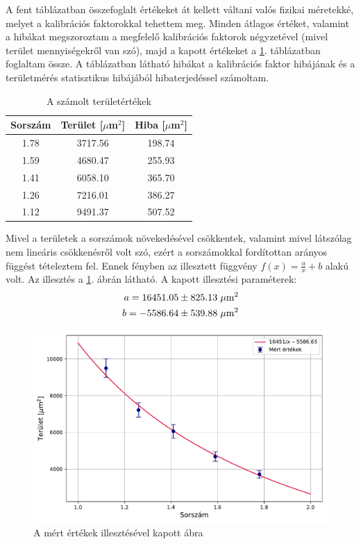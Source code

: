 \documentclass[12pt,a4paper]{article}
\begin{document}
A fent táblázatban összefoglalt értékeket át kellett váltani valós fizikai méretekké, melyet a kalibrációs faktorokkal tehettem meg. Minden átlagos értéket, valamint a hibákat megszoroztam a megfelelő kalibrációs faktorok négyzetével (mivel terület mennyiségekről van szó), majd a kapott értékeket a \ref{szil:ertek}. táblázatban foglaltam össze. A táblázatban látható hibákat a kalibrációs faktor hibájának és a területmérés statisztikus hibájából hibaterjedéssel számoltam.
\newpage
\begin{table}
\begin{center}
\begin{tabular}{|c|c|c|}
\hline
Sorszám & Terület [$\mu$m$^2$] & Hiba [$\mu$m$^2$] \\
\hline
1.78 & 3717.56 & 198.74\\
\hline
1.59 & 4680.47 & 255.93\\
\hline
1.41 & 6058.10 & 365.70\\
\hline
1.26 & 7216.01 & 386.27\\
\hline
1.12 & 9491.37 & 507.52\\
\hline
\end{tabular}
\caption{A számolt területértékek}
\label{szil:ertek}
\end{center}
\end{table}
Mivel a területek a sorszámok növekedésével csökkentek, valamint mivel látszólag nem lineáris csökkenésről volt szó, ezért a sorszámokkal fordítottan arányos függést tételeztem fel. Ennek fényben az illesztett függvény $f(x) = \frac{a}{x}+{b}$ alakú volt. Az illesztés a \ref{fig:illeszt}. ábrán látható. A kapott illesztési paraméterek:
\begin{equation}
\begin{split}
a = 16451.05 \pm 825.13 \hspace*{3pt} \mu\textrm{m}^2\\
b = -5586.64 \pm 539.88 \hspace*{3pt} \mu\textrm{m}^2\\
\end{split}
\end{equation}

\begin{figure}[!h]
\centering
\includegraphics[width=0.8\linewidth]{szil_illesztes}
\caption{A mért értékek illesztésével kapott ábra}
\label{fig:illeszt}
\end{figure}
\end{document}
